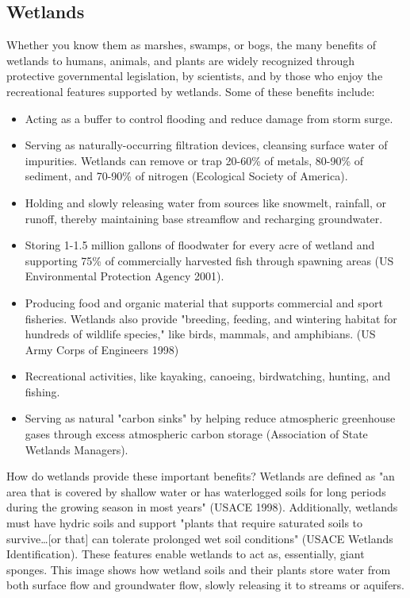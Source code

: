 \subsection{Wetlands}\label{subsec:wetland}
Whether you know them as marshes, swamps, or bogs, the many benefits of 
wetlands to humans, animals, and plants are widely recognized through 
protective governmental legislation, by scientists, and by those who enjoy the 
recreational features supported by wetlands. Some of these benefits include:
\begin{itemize}
    \item Acting as a buffer to control flooding and reduce damage from storm 
    surge.
    \item Serving as naturally-occurring filtration devices, cleansing surface 
    water of impurities.  Wetlands can remove or trap 20-60\% of metals, 80-90\% 
    of sediment, and 70-90\% of nitrogen (Ecological Society of America).
    \item Holding and slowly releasing water from sources like snowmelt, 
    rainfall, or runoff, thereby maintaining base streamflow and recharging 
    groundwater.
    \item Storing 1-1.5 million gallons of floodwater for every acre of wetland
    and supporting 75\% of commercially harvested fish through spawning areas 
    (US Environmental Protection Agency 2001).
    \item Producing food and organic material that supports commercial and 
    sport fisheries. Wetlands also provide "breeding, feeding, and wintering 
    habitat for hundreds of wildlife species," like birds, mammals, and 
    amphibians. (US Army Corps of Engineers 1998)
    \item Recreational activities, like kayaking, canoeing, birdwatching, 
    hunting, and fishing.
    \item Serving as natural "carbon sinks" by helping reduce atmospheric
    greenhouse gases through excess atmospheric carbon storage (Association 
    of State Wetlands Managers).
\end{itemize}

How do wetlands provide these important benefits? Wetlands are defined as "an 
area that is covered by shallow water or has waterlogged soils for long periods 
during the growing season in most years" (USACE 1998). Additionally, wetlands 
must have hydric soils and support "plants that require saturated soils to 
survive\ldots [or that] can tolerate prolonged wet soil conditions" (USACE 
Wetlands Identification). These features enable wetlands to act as, 
essentially, giant sponges. This image shows how wetland soils and their plants 
store water from both surface flow and groundwater flow, slowly releasing it to 
streams or aquifers.


